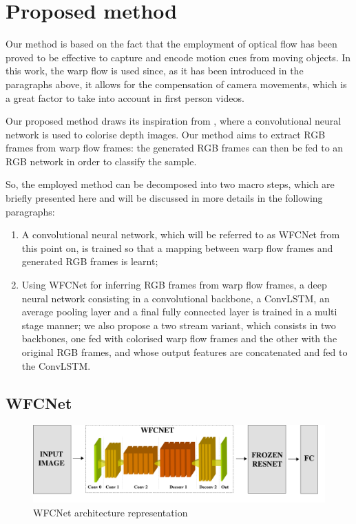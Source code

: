 \documentclass[10pt,twocolumn,letterpaper]{article}
\begin{document}
\section{Proposed method}
Our method is based on the fact that the employment of optical flow has been proved to be effective to capture and encode motion cues from moving objects. In this work, the warp flow is used since, as it has been introduced in the paragraphs above, it allows for the compensation of camera movements, which is a great factor to take into account in first person videos.

Our proposed method draws its inspiration from \cite{carlucci2017de2}, where a convolutional neural network is used to colorise depth images. Our method aims to extract RGB frames from warp flow frames: the generated RGB frames can then be fed to an RGB network in order to classify the sample.

So, the employed method can be decomposed into two macro steps, which are briefly presented here and will be discussed in more details in the following paragraphs:
\begin{enumerate}
	\item A convolutional neural network, which will be referred to as WFCNet from this point on, is trained so that a mapping between warp flow frames and generated RGB frames is learnt; 
	\item Using WFCNet for inferring RGB frames from warp flow frames, a deep neural network consisting in a convolutional backbone, a ConvLSTM, an average pooling layer and a final fully connected layer is trained in a multi stage manner; we also propose a two stream variant, which consists in two backbones, one fed with colorised warp flow frames and the other with the original RGB frames, and whose output features are concatenated and fed to the ConvLSTM.
\end{enumerate}

\subsection{WFCNet}

\begin{figure}
	\begin{center}
		\includegraphics[width=\textwidth]{schemi/WFCNet.img.pdf}		
	\end{center}
	\caption{WFCNet architecture representation}
	\label{fig:WFCNet}
\end{figure}
\end{document}
